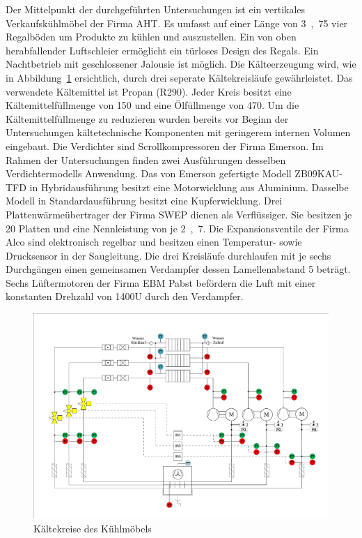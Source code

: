 Der Mittelpunkt der durchgeführten Untersuchungen ist ein vertikales Verkaufskühlmöbel der Firma AHT.
Es umfasst auf einer Länge von \unit{3,75}{\metre} vier Regalböden um Produkte zu kühlen und auszustellen. Ein von oben herabfallender Luftschleier ermöglicht ein türloses Design des Regals. Ein Nachtbetrieb mit geschlossener Jalousie ist möglich. Die Kälteerzeugung wird, wie in Abbildung~\ref{fig:IDC150} ersichtlich, durch drei seperate Kältekreisläufe gewährleistet. Das verwendete Kältemittel ist Propan (R290). Jeder Kreis besitzt eine Kältemittelfüllmenge von \unit{150}{\gram} und eine Ölfüllmenge von \unit{470}{\gram}. Um die Kältemittelfüllmenge zu reduzieren wurden bereits vor Beginn der Untersuchungen kältetechnische Komponenten mit geringerem internen Volumen eingebaut. Die Verdichter sind Scrollkompressoren der Firma Emerson.  Im Rahmen der Untersuchungen finden zwei Ausführungen desselben Verdichtermodells Anwendung. Das von Emerson gefertigte Modell ZB09KAU-TFD in Hybridausführung besitzt eine Motorwicklung aus Aluminium. Dasselbe Modell in Standardausführung besitzt eine Kupferwicklung. Drei Plattenwärmeübertrager der Firma SWEP dienen als Verflüssiger. Sie besitzen je 20 Platten und eine Nennleistung von je \unit{2,7}{\kilo\watt}. Die Expansionsventile der Firma Alco sind elektronisch regelbar und besitzen einen Temperatur- sowie Drucksensor in der Saugleitung. Die drei Kreisläufe durchlaufen mit je sechs Durchgängen einen gemeinsamen Verdampfer dessen Lamellenabstand \unit{5}{\milli\metre} beträgt. Sechs Lüftermotoren der Firma EBM Pabst befördern die Luft mit einer konstanten Drehzahl von \unit{1400}{U\per\min} durch den Verdampfer.

\begin{figure} %
\centering
\includegraphics[scale=.5,angle=90]{Pictures/IDC150.pdf}
\caption{Kältekreise des Kühlmöbels}
\label{fig:IDC150}
\end{figure}



